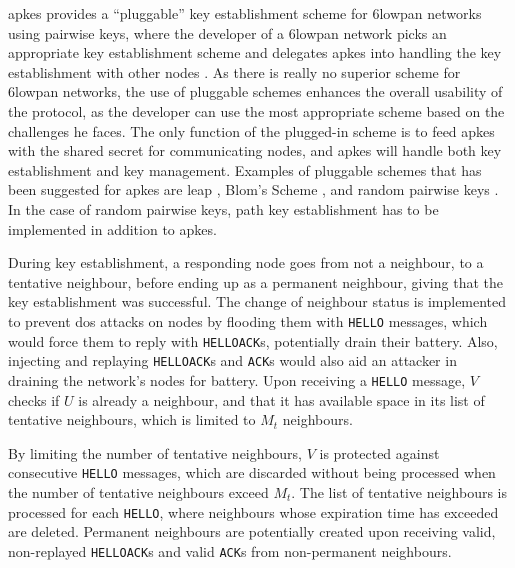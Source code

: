 \gls{apkes} provides a ``pluggable'' key establishment scheme for \gls{6lowpan} networks using pairwise keys, where the developer of a \gls{6lowpan} network picks an appropriate key establishment scheme and delegates \gls{apkes} into handling the key establishment with other nodes \cite{krentz20136lowpan}. As there is really no superior scheme for \gls{6lowpan} networks, the use of pluggable schemes enhances the overall usability of the protocol, as the developer can use the most appropriate scheme based on the challenges he faces. The only function of the plugged-in scheme is to feed \gls{apkes} with the shared secret for communicating nodes, and \gls{apkes} will handle both key establishment and key management. Examples of pluggable schemes that has been suggested for \gls{apkes} are \gls{leap} \cite{zhu2006leap+}, Blom's Scheme \cite{blom1984optimal}, and random pairwise keys \cite{chan2003random}. In the case of random pairwise keys, path key establishment has to be implemented in addition to \gls{apkes}.




During key establishment, a responding node goes from not a neighbour, to a tentative neighbour, before ending up as a permanent neighbour, giving that the key establishment was successful. The change of neighbour status is implemented to prevent \gls{dos} attacks on nodes by flooding them with \texttt{HELLO} messages, which would force them to reply with \texttt{HELLOACK}s, potentially drain their battery. Also, injecting and replaying \texttt{HELLOACK}s and \texttt{ACK}s would also aid an attacker in draining the network's nodes for battery. Upon receiving a \texttt{HELLO} message, $V$ checks if $U$ is already a neighbour, and that it has available space in its list of tentative neighbours, which is limited to $M_t$ neighbours. 

By limiting the number of tentative neighbours, $V$ is protected against consecutive \texttt{HELLO} messages, which are discarded without being processed when the number of tentative neighbours exceed $M_t$. The list of tentative neighbours is processed for each \texttt{HELLO}, where neighbours whose expiration time has exceeded are deleted. Permanent neighbours are potentially created upon receiving valid, non-replayed \texttt{HELLOACK}s and valid \texttt{ACK}s from non-permanent neighbours. 



